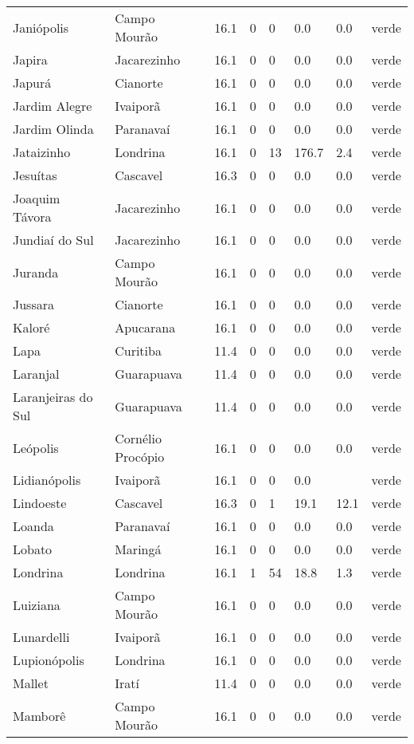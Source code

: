 \begin{longtable}{l|lllllll}
  Janiópolis & Campo Mourão & 16.1 & 0 & 0 & 0.0 & 0.0 & verde \\ 
  Japira & Jacarezinho & 16.1 & 0 & 0 & 0.0 & 0.0 & verde \\ 
  Japurá & Cianorte & 16.1 & 0 & 0 & 0.0 & 0.0 & verde \\ 
  Jardim Alegre & Ivaiporã & 16.1 & 0 & 0 & 0.0 & 0.0 & verde \\ 
  Jardim Olinda & Paranavaí & 16.1 & 0 & 0 & 0.0 & 0.0 & verde \\ 
  Jataizinho & Londrina & 16.1 & 0 & 13 & 176.7 & 2.4 & verde \\ 
  Jesuítas & Cascavel & 16.3 & 0 & 0 & 0.0 & 0.0 & verde \\ 
  Joaquim Távora & Jacarezinho & 16.1 & 0 & 0 & 0.0 & 0.0 & verde \\ 
  Jundiaí do Sul & Jacarezinho & 16.1 & 0 & 0 & 0.0 & 0.0 & verde \\ 
  Juranda & Campo Mourão & 16.1 & 0 & 0 & 0.0 & 0.0 & verde \\ 
  Jussara & Cianorte & 16.1 & 0 & 0 & 0.0 & 0.0 & verde \\ 
  Kaloré & Apucarana & 16.1 & 0 & 0 & 0.0 & 0.0 & verde \\ 
  Lapa & Curitiba & 11.4 & 0 & 0 & 0.0 & 0.0 & verde \\ 
  Laranjal & Guarapuava & 11.4 & 0 & 0 & 0.0 & 0.0 & verde \\ 
  Laranjeiras do Sul & Guarapuava & 11.4 & 0 & 0 & 0.0 & 0.0 & verde \\ 
  Leópolis & Cornélio Procópio & 16.1 & 0 & 0 & 0.0 & 0.0 & verde \\ 
  Lidianópolis & Ivaiporã & 16.1 & 0 & 0 & 0.0 &  & verde \\ 
  Lindoeste & Cascavel & 16.3 & 0 & 1 & 19.1 & 12.1 & verde \\ 
  Loanda & Paranavaí & 16.1 & 0 & 0 & 0.0 & 0.0 & verde \\ 
  Lobato & Maringá & 16.1 & 0 & 0 & 0.0 & 0.0 & verde \\ 
  Londrina & Londrina & 16.1 & 1 & 54 & 18.8 & 1.3 & verde \\ 
  Luiziana & Campo Mourão & 16.1 & 0 & 0 & 0.0 & 0.0 & verde \\ 
  Lunardelli & Ivaiporã & 16.1 & 0 & 0 & 0.0 & 0.0 & verde \\ 
  Lupionópolis & Londrina & 16.1 & 0 & 0 & 0.0 & 0.0 & verde \\ 
  Mallet & Iratí & 11.4 & 0 & 0 & 0.0 & 0.0 & verde \\ 
  Mamborê & Campo Mourão & 16.1 & 0 & 0 & 0.0 & 0.0 & verde \\ 

\end{longtable}
